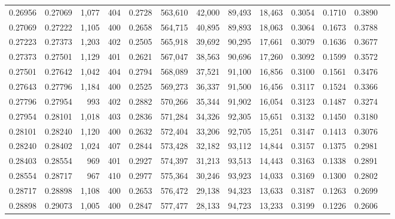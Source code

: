 \begin{tabular}{rrrrrrrrrrrrr}
0.26956 & 0.27069 &  1,077 & 404 &                                     0.2728 & 563,610 &  42,000 &  89,493 &  18,463 & 0.3054 & 0.1710 & 0.3890 \\
0.27069 & 0.27222 &  1,105 & 400 &                                     0.2658 & 564,715 &  40,895 &  89,893 &  18,063 & 0.3064 & 0.1673 & 0.3788 \\
0.27223 & 0.27373 &  1,203 & 402 &                                     0.2505 & 565,918 &  39,692 &  90,295 &  17,661 & 0.3079 & 0.1636 & 0.3677 \\
0.27373 & 0.27501 &  1,129 & 401 &                                     0.2621 & 567,047 &  38,563 &  90,696 &  17,260 & 0.3092 & 0.1599 & 0.3572 \\
0.27501 & 0.27642 &  1,042 & 404 &                                     0.2794 & 568,089 &  37,521 &  91,100 &  16,856 & 0.3100 & 0.1561 & 0.3476 \\
0.27643 & 0.27796 &  1,184 & 400 &                                     0.2525 & 569,273 &  36,337 &  91,500 &  16,456 & 0.3117 & 0.1524 & 0.3366 \\
0.27796 & 0.27954 &    993 & 402 &                                     0.2882 & 570,266 &  35,344 &  91,902 &  16,054 & 0.3123 & 0.1487 & 0.3274 \\
0.27954 & 0.28101 &  1,018 & 403 &                                     0.2836 & 571,284 &  34,326 &  92,305 &  15,651 & 0.3132 & 0.1450 & 0.3180 \\
0.28101 & 0.28240 &  1,120 & 400 &                                     0.2632 & 572,404 &  33,206 &  92,705 &  15,251 & 0.3147 & 0.1413 & 0.3076 \\
0.28240 & 0.28402 &  1,024 & 407 &                                     0.2844 & 573,428 &  32,182 &  93,112 &  14,844 & 0.3157 & 0.1375 & 0.2981 \\
0.28403 & 0.28554 &    969 & 401 &                                     0.2927 & 574,397 &  31,213 &  93,513 &  14,443 & 0.3163 & 0.1338 & 0.2891 \\
0.28554 & 0.28717 &    967 & 410 &                                     0.2977 & 575,364 &  30,246 &  93,923 &  14,033 & 0.3169 & 0.1300 & 0.2802 \\
0.28717 & 0.28898 &  1,108 & 400 &                                     0.2653 & 576,472 &  29,138 &  94,323 &  13,633 & 0.3187 & 0.1263 & 0.2699 \\
0.28898 & 0.29073 &  1,005 & 400 &                                     0.2847 & 577,477 &  28,133 &  94,723 &  13,233 & 0.3199 & 0.1226 & 0.2606 \\

\end{tabular}
